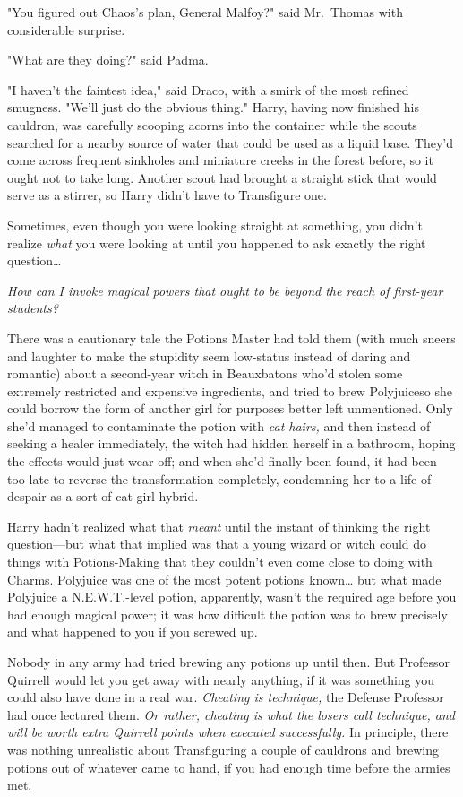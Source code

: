"You figured out Chaos's plan, General Malfoy?" said Mr.~Thomas with 
considerable surprise.

"What are they doing?" said Padma.

"I haven't the faintest idea," said Draco, with a smirk of the most refined 
smugness. "We'll just do the obvious thing."
\sbreak
Harry, having now finished his cauldron, was carefully scooping acorns into the 
container while the scouts searched for a nearby source of water that could be 
used as a liquid base. They'd come across frequent sinkholes and miniature 
creeks in the forest before, so it ought not to take long. Another scout had 
brought a straight stick that would serve as a stirrer, so Harry didn't have to 
Transfigure one.

Sometimes, even though you were looking straight at something, you didn't 
realize \emph{what} you were looking at until you happened to ask exactly the 
right question{\ldots}

\emph{How can I invoke magical powers that ought to be beyond the reach of 
first-year students?}

There was a cautionary tale the Potions Master had told them (with much sneers 
and laughter to make the stupidity seem low-status instead of daring and 
romantic) about a second-year witch in Beauxbatons who'd stolen some extremely 
restricted and expensive ingredients, and tried to brew Polyjuiceso she could 
borrow the form of another girl for purposes better left unmentioned. Only 
she'd managed to contaminate the potion with \emph{cat hairs,} and then instead 
of seeking a healer immediately, the witch had hidden herself in a bathroom, 
hoping the effects would just wear off; and when she'd finally been found, it 
had been too late to reverse the transformation completely, condemning her to a 
life of despair as a sort of cat-girl hybrid.

Harry hadn't realized what that\emph{ meant} until the instant of thinking the 
right question---but what that implied was that a young wizard or witch could 
do things with Potions-Making that they couldn't even come close to doing with 
Charms. Polyjuice was one of the most potent potions known{\ldots} but what 
made Polyjuice a N.E.W.T.-level potion, apparently, wasn't the required age 
before you had enough magical power; it was how difficult the potion was to 
brew precisely and what happened to you if you screwed up.

Nobody in any army had tried brewing any potions up until then. But Professor 
Quirrell would let you get away with nearly anything, if it was something you 
could also have done in a real war. \emph{Cheating is technique,} the Defense 
Professor had once lectured them. \emph{Or rather, cheating is what the losers 
call technique, and will be worth extra Quirrell points when executed 
successfully.} In principle, there was nothing unrealistic about Transfiguring 
a couple of cauldrons and brewing potions out of whatever came to hand, if you 
had enough time before the armies met.

